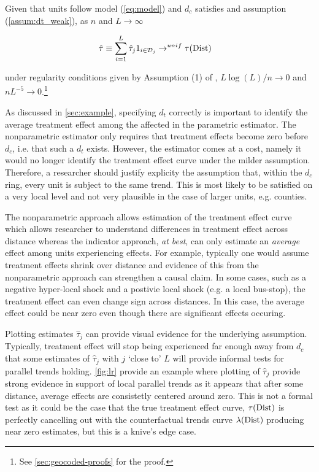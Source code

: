 \begin{proposition}\label{prop:np_identification}  
    Given that units follow model (\ref{eq:model}) and $d_c$ satisfies  and assumption (\ref{assum:dt_weak}), as $n$ and $L \to \infty$ 

    \begin{align*}
        \hat{\tau} &\equiv \sum_{i=1}^L \hat{\tau}_j 1_{i \in \mathcal{D}_j} \to^{unif} \tau(\text{Dist})
    \end{align*}

    under regularity conditions given by Assumption (1) of \citet{Cattaneo_Farrell_Feng_2019}, $L \log(L)/n \to 0$ and $nL^{-5} \to 0$.\footnote{See \autoref{sec:geocoded-proofs} for the proof.}
\end{proposition}

As discussed in \autoref{sec:example}, specifying $d_t$ correctly is important to identify the average treatment effect among the affected in the parametric estimator. The nonparametric estimator only requires that treatment effects become zero before $d_c$, i.e. that such a $d_t$ exists. However, the estimator comes at a cost, namely it would no longer identify the treatment effect curve under the milder  assumption. Therefore, a researcher should justify explicity the assumption that, within the $d_c$ ring, every unit is subject to the same trend. This is most likely to be satisfied on a very local level and not very plausible in the case of larger units, e.g. counties.

The nonparametric approach allows estimation of the treatment effect curve which allows researcher to understand differences in treatment effect across distance whereas the indicator approach, \textit{at best}, can only estimate an \textit{average} effect among units experiencing effects. For example, typically one would assume treatment effects shrink over distance and evidence of this from the nonparametric approach can strengthen a causal claim. In some cases, such as a negative hyper-local shock and a postivie local shock (e.g. a local bus-stop), the treatment effect can even change sign across distances. In this case, the average effect could be near zero even though there are significant effects occuring. 

Plotting estimates $\hat{\tau}_j$ can provide visual evidence for the underlying  assumption. Typically, treatment effect will stop being experienced far enough away from $d_c$ that some estimates of $\hat{\tau}_j$ with $j$ `close to' $L$ will provide informal tests for parallel trends holding. \autoref{fig:lr} provide an example where plotting of $\hat{\tau}_j$ provide strong evidence in support of local parallel trends as it appears that after some distance, average effects are consistetly centered around zero. This is not a formal test as it could be the case that the true treatment effect curve, $\tau(\text{Dist})$ is perfectly cancelling out with the counterfactual trends curve $\lambda(\text{Dist})$ producing near zero estimates, but this is a knive's edge case. 


